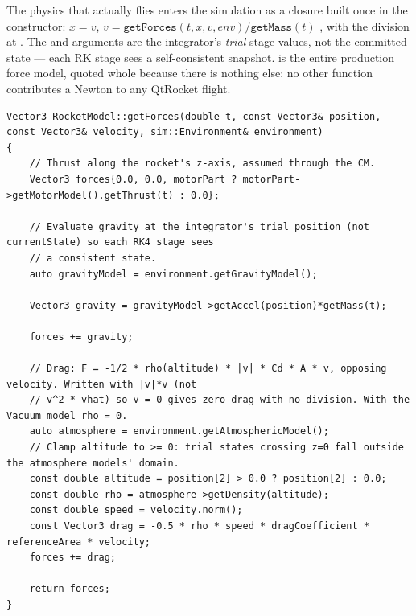 The physics that actually flies enters the simulation as a closure built once in the
 constructor: $\dot{x} = v$,
$\dot{v} = \mathtt{getForces}(t, x, v, \mathit{env})/\mathtt{getMass}(t)$
, with the division at . The
 and  arguments are the integrator's \emph{trial} stage
values, not the committed state --- each RK stage sees a self-consistent snapshot.
 is the entire production force model, quoted whole because there
is nothing else: no other function contributes a Newton to any QtRocket flight.

\begin{listing}[htbp]
\begin{verbatim}
Vector3 RocketModel::getForces(double t, const Vector3& position, const Vector3& velocity, sim::Environment& environment)
{
    // Thrust along the rocket's z-axis, assumed through the CM.
    Vector3 forces{0.0, 0.0, motorPart ? motorPart->getMotorModel().getThrust(t) : 0.0};

    // Evaluate gravity at the integrator's trial position (not currentState) so each RK4 stage sees
    // a consistent state.
    auto gravityModel = environment.getGravityModel();

    Vector3 gravity = gravityModel->getAccel(position)*getMass(t);

    forces += gravity;

    // Drag: F = -1/2 * rho(altitude) * |v| * Cd * A * v, opposing velocity. Written with |v|*v (not
    // v^2 * vhat) so v = 0 gives zero drag with no division. With the Vacuum model rho = 0.
    auto atmosphere = environment.getAtmosphericModel();
    // Clamp altitude to >= 0: trial states crossing z=0 fall outside the atmosphere models' domain.
    const double altitude = position[2] > 0.0 ? position[2] : 0.0;
    const double rho = atmosphere->getDensity(altitude);
    const double speed = velocity.norm();
    const Vector3 drag = -0.5 * rho * speed * dragCoefficient * referenceArea * velocity;
    forces += drag;

    return forces;
}
\end{verbatim}
\caption{The entire production force model : thrust along
world $+z$, gravity at the trial position, and one quadratic drag term. Everything this
section calls dormant is dormant because it does not appear here.}\label{lst:aero-getforces}
\end{listing}

